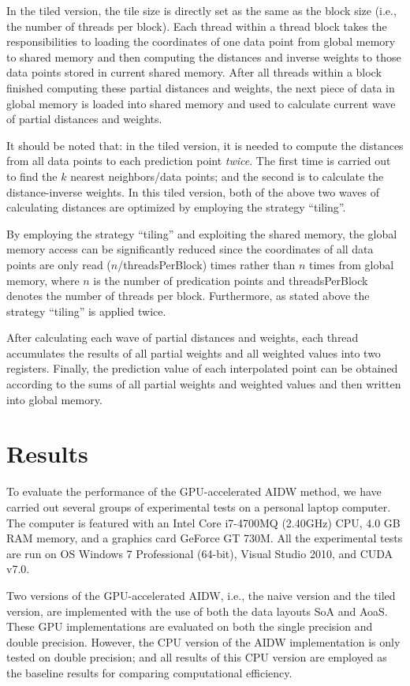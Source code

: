 \documentclass[fleqn,11pt]{wlscirep}
\begin{document}
In the tiled version, the tile size is directly set as the same as the block 
size (i.e., the number of threads per block). Each thread within a thread 
block takes the responsibilities to loading the coordinates of one data 
point from global memory to shared memory and then computing the distances 
and inverse weights to those data points stored in current shared memory. 
After all threads within a block finished computing these partial distances 
and weights, the next piece of data in global memory is loaded into shared 
memory and used to calculate current wave of partial distances and weights.

It should be noted that: in the tiled version, it is needed to compute the 
distances from all data points to each prediction point \textit{twice}. The first time is 
carried out to find the $k $ nearest neighbors/data points; and the second is 
to calculate the distance-inverse weights. In this tiled version, both of 
the above two waves of calculating distances are optimized by employing the 
strategy ``tiling''.

By employing the strategy ``tiling'' and exploiting the shared memory, the 
global memory access can be significantly reduced since the coordinates of 
all data points are only read ($n $/threadsPerBlock) times rather than $n$ times 
from global memory, where $n$ is the number of predication points and 
threadsPerBlock denotes the number of threads per block. Furthermore, as 
stated above the strategy ``tiling'' is applied twice.

After calculating each wave of partial distances and weights, each thread 
accumulates the results of all partial weights and all weighted values into 
two registers. Finally, the prediction value of each interpolated point can 
be obtained according to the sums of all partial weights and weighted values 
and then written into global memory.

\section{Results}\label{sec4}
To evaluate the performance of the GPU-accelerated AIDW method, we have 
carried out several groups of experimental tests on a personal laptop 
computer. The computer is featured with an Intel Core i7-4700MQ (2.40GHz) 
CPU, 4.0 GB RAM memory, and a graphics card GeForce GT 730M. All the 
experimental tests are run on OS Windows 7 Professional (64-bit), Visual 
Studio 2010, and CUDA v7.0.

Two versions of the GPU-accelerated AIDW, i.e., the naive version and the 
tiled version, are implemented with the use of both the data layouts SoA and 
AoaS. These GPU implementations are evaluated on both the single precision 
and double precision. However, the CPU version of the AIDW implementation is 
only tested on double precision; and all results of this CPU version are 
employed as the baseline results for comparing computational efficiency. 
\end{document}
